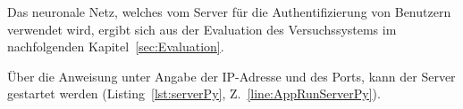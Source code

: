 Das neuronale Netz, welches vom Server für die Authentifizierung von Benutzern verwendet wird, ergibt sich aus der Evaluation des Versuchssystems im nachfolgenden Kapitel~\ref{sec:Evaluation}.

Über die Anweisung  unter Angabe der IP-Adresse und des Ports, kann der Server gestartet werden (Listing~\ref{lst:serverPy}, Z.~\ref{line:AppRunServerPy}).

\textauthor{\vHS}{}{}